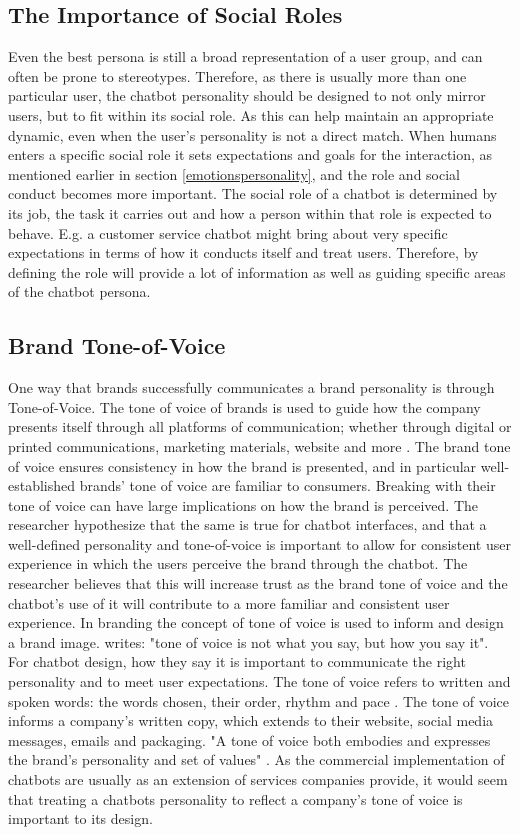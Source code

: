 \subsection{The Importance of Social Roles}
Even the best persona is still a broad representation of a user group, and can often be prone to stereotypes. Therefore, as there is usually more than one particular user, the chatbot personality should be designed to not only mirror users, but to fit within its social role. As this can help maintain an appropriate dynamic, even when the user's personality is not a direct match. When humans enters a specific social role it sets expectations and goals for the interaction, as mentioned earlier in section \ref{emotionspersonality}, and the role and social conduct becomes more important. The social role of a chatbot is determined by its job, the task it carries out and how a person within that role is expected to behave. E.g. a customer service chatbot might bring about very specific expectations in terms of how it conducts itself and treat users. Therefore, by defining the role will provide a lot of information as well as guiding specific areas of the chatbot persona.

\subsection{Brand Tone-of-Voice}

One way that brands successfully communicates a brand personality is through Tone-of-Voice. The tone of voice of brands is used to guide how the company presents itself through all platforms of communication; whether through digital or printed communications, marketing materials, website and more \citep{cummings2017}. The brand tone of voice ensures consistency in how the brand is presented, and in particular well-established brands' tone of voice are familiar to consumers. Breaking with their tone of voice can have large implications on how the brand is perceived. The researcher hypothesize that the same is true for chatbot interfaces, and that a well-defined personality and tone-of-voice is important to allow for consistent user experience in which the users perceive the brand through the chatbot. The researcher believes that this will increase trust as the brand tone of voice and the chatbot's use of it will contribute to a more familiar and consistent user experience. In branding the concept of tone of voice is used to inform and design a brand image. \cite{cummings2017} writes: "tone of voice is not what you say, but how you say it". For chatbot design, how they say it is important to communicate the right personality and to meet user expectations. The tone of voice refers to written and spoken words: the words chosen, their order, rhythm and pace \citep{cummings2017}. The tone of voice informs a company's written copy, which extends to their website, social media messages, emails and packaging. "A tone of voice both embodies and expresses the brand's personality and set of values" \citep{cummings2017}. As the commercial implementation of chatbots are usually as an extension of services companies provide, it would seem that treating a chatbots personality to reflect a company's tone of voice is important to its design. 

